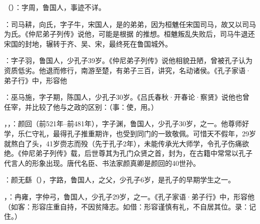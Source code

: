 （）：字周，鲁国人，事迹不详。

：司马耕，向氏，字子牛，宋国人，是的弟弟，因为桓魋任宋国司马，故又以司马为氏。《仲尼弟子列传》说他，可能是根据  的推想。桓魋叛乱失败后，司马牛退还宋国的封地，辗转于齐、吴、宋，最终死在鲁国城外。

：字子羽，鲁国人，少孔子39岁。《仲尼弟子列传》说他相貌丑陋，曾被孔子认为资质低劣。他退而修行，南游至楚，有弟子三百，讲究，名动诸侯。《孔子家语·弟子行》中，形容他 %

：巫马施，字子期，陈国人，少孔子30岁。《吕氏春秋·开春论·察贤》说他也曾任宰，并比较了他与之政的区别：（事：使，用。）

，，：颜回（前521年--前481年），字子渊，鲁国人，少孔子30岁，之一。他尊师好学，乐仁守礼，最得孔子推重期许，也受到同门的一致敬佩。可惜天不假年，29岁就熬白了头，41岁赍志而殁（先于孔子2年），未能传承光大师学，令孔子伤痛欲绝。《仲尼弟子列传》载，后世尊其为孔门众贤之首，封为，在古籍中常常以孔子代言人的形象出现。唐代名臣、书法家颜真卿是颜回的40世孙。%

：颜无繇（），字路，鲁国人，之父，少孔子6岁，是孔子的早期学生之一。

，：冉雍，字仲弓，鲁国人，少孔子29岁，之一。《孔子家语·弟子行》中，形容他（如客：形容庄重自持，不因贫降志。如借：形容谨慎有礼，不自居其位。录：记住。）

